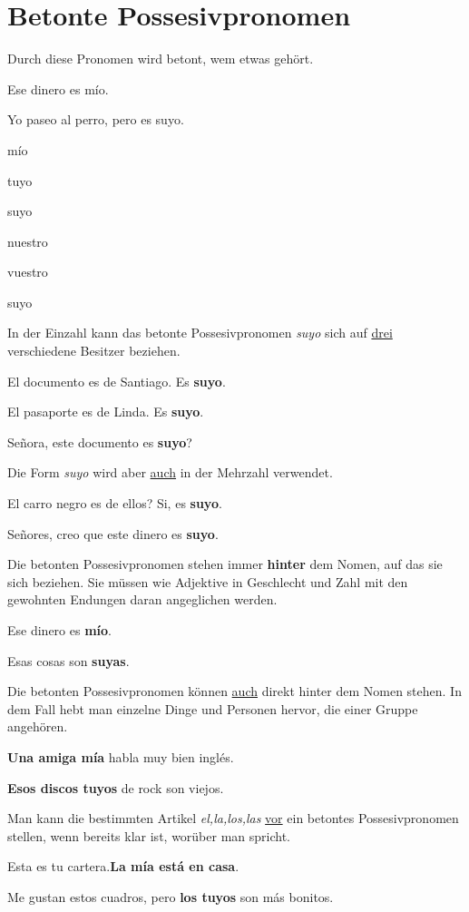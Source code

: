 \section{Betonte Possesivpronomen}
Durch diese Pronomen wird betont, wem etwas gehört.
\begin{ejemplos}
    \item Ese dinero es m\'io.
    \item Yo paseo al perro, pero es suyo.
\end{ejemplos}
\begin{gramatica}
    \item m\'io
    \item tuyo
    \item suyo
    \item nuestro
    \item vuestro
    \item suyo
\end{gramatica}
In der Einzahl kann das betonte Possesivpronomen \textit{suyo} 
sich auf \underline{drei} verschiedene Besitzer beziehen.
\begin{ejemplos}
    \item El documento es de Santiago. Es \textbf{suyo}.
    \item El pasaporte es de Linda. Es \textbf{suyo}.
    \item Se\~nora, este documento es \textbf{suyo}?
\end{ejemplos}
Die Form \textit{suyo} wird aber \underline{auch} in der Mehrzahl
verwendet.
\begin{ejemplos}
    \item El carro negro es de ellos? Si, es \textbf{suyo}.
    \item Se\~nores, creo que este dinero es \textbf{suyo}.
\end{ejemplos}
Die betonten Possesivpronomen stehen immer \textbf{hinter} dem Nomen,
auf das sie sich beziehen. Sie müssen wie Adjektive in Geschlecht und 
Zahl mit den gewohnten Endungen daran angeglichen werden.
\begin{ejemplos}
    \item Ese dinero es \textbf{m\'io}.
    \item Esas cosas son \textbf{suyas}.
\end{ejemplos}
Die betonten Possesivpronomen können \underline{auch} direkt hinter dem 
Nomen stehen. In dem Fall hebt man einzelne Dinge und Personen hervor,
die einer Gruppe angehören.
\begin{ejemplos}
    \item \textbf{Una amiga m\'ia} habla muy bien ingl\'es.
    \item \textbf{Esos discos tuyos} de rock son viejos.
\end{ejemplos}
Man kann die bestimmten Artikel \textit{el,la,los,las} \underline{vor} 
ein betontes Possesivpronomen stellen, wenn bereits klar ist,
worüber man spricht.
\begin{ejemplos}
    \item Esta es tu cartera.\textbf{La m\'ia est\'a en casa}.
    \item Me gustan estos cuadros, pero \textbf{los tuyos} 
    son m\'as bonitos.
\end{ejemplos}
